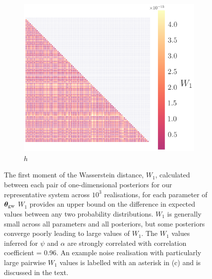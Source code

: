 \documentclass[fleqn,usenatbib,useAMS]{mnras}
\begin{document}
\begin{figure}
\begin{subfigure}[b]{0.3\textwidth}
		\includegraphics[width=\textwidth]{images/WD_6}
		\caption{$h$}
	\end{subfigure}
	\caption{The first moment of the Wasserstein distance, $W_1$, calculated between each pair of one-dimensional posteriors for our representative system across $10^3$ realisations, for each parameter of $\boldsymbol{\theta}_{\rm gw}$  $W_1$ provides an upper bound on the difference in expected values between any two probability distributions. $W_1$ is generally small across all parameters and all posteriors, but some posteriors converge poorly leading to large values of $W_1$. The $W_1$ values inferred for $\psi$ and $\alpha$ are strongly correlated with correlation coefficient = 0.96. An example noise realisation with particularly large pairwise $W_1$ values is labelled with an asterisk in (c) and is discussed in the text.} \label{fig:pairwise_wasserstein}
\end{figure}
\end{document}
